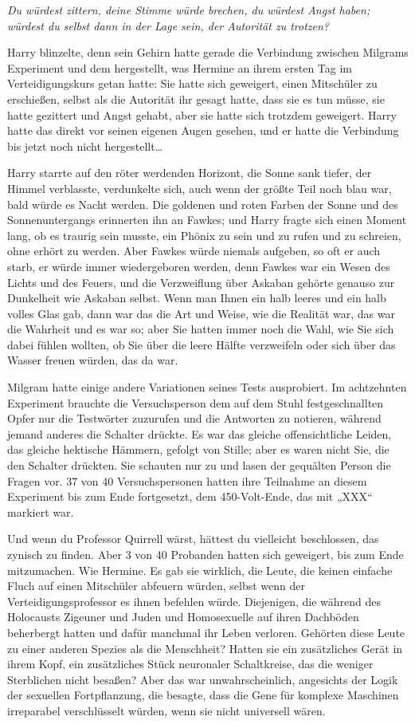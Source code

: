 {\emph{Du würdest zittern, deine Stimme würde brechen, du würdest Angst haben; würdest du selbst dann in der Lage sein, der Autorität zu trotzen?}

Harry blinzelte, denn sein Gehirn hatte gerade die Verbindung zwischen Milgrams Experiment und dem hergestellt, was Hermine an ihrem ersten Tag im Verteidigungskurs getan hatte: Sie hatte sich geweigert, einen Mitschüler zu erschießen, selbst als die Autorität ihr gesagt hatte, dass sie es tun müsse, sie hatte gezittert und Angst gehabt, aber sie hatte sich trotzdem geweigert. Harry hatte das direkt vor seinen eigenen Augen gesehen, und er hatte die Verbindung bis jetzt noch nicht hergestellt…

Harry starrte auf den röter werdenden Horizont, die Sonne sank tiefer, der Himmel verblasste, verdunkelte sich, auch wenn der größte Teil noch blau war, bald würde es Nacht werden. Die goldenen und roten Farben der Sonne und des Sonnenuntergangs erinnerten ihn an Fawkes; und Harry fragte sich einen Moment lang, ob es traurig sein musste, ein Phönix zu sein und zu rufen und zu schreien, ohne erhört zu werden. Aber Fawkes würde niemals aufgeben, so oft er auch starb, er würde immer wiedergeboren werden, denn Fawkes war ein Wesen des Lichts und des Feuers, und die Verzweiflung über Askaban gehörte genauso zur Dunkelheit wie Askaban selbst. Wenn man Ihnen ein halb leeres und ein halb volles Glas gab, dann war das die Art und Weise, wie die Realität war, das war die Wahrheit und es war so; aber Sie hatten immer noch die Wahl, wie Sie sich dabei fühlen wollten, ob Sie über die leere Hälfte verzweifeln oder sich über das Wasser freuen würden, das da war.

Milgram hatte einige andere Variationen seines Tests ausprobiert. Im achtzehnten Experiment brauchte die Versuchsperson dem auf dem Stuhl festgeschnallten Opfer nur die Testwörter zuzurufen und die Antworten zu notieren, während jemand anderes die Schalter drückte. Es war das gleiche offensichtliche Leiden, das gleiche hektische Hämmern, gefolgt von Stille; aber es waren nicht Sie, die den Schalter drückten. Sie schauten nur zu und lasen der gequälten Person die Fragen vor. 37 von 40 Versuchspersonen hatten ihre Teilnahme an diesem Experiment bis zum Ende fortgesetzt, dem 450-Volt-Ende, das mit „XXX“ markiert war.

Und wenn du Professor Quirrell wärst, hättest du vielleicht beschlossen, das zynisch zu finden. Aber 3 von 40 Probanden hatten sich geweigert, bis zum Ende mitzumachen. Wie Hermine. Es gab sie wirklich, die Leute, die keinen einfache Fluch auf einen Mitschüler abfeuern würden, selbst wenn der Verteidigungsprofessor es ihnen befehlen würde. Diejenigen, die während des Holocausts Zigeuner und Juden und Homosexuelle auf ihren Dachböden beherbergt hatten und dafür manchmal ihr Leben verloren. Gehörten diese Leute zu einer anderen Spezies als die Menschheit? Hatten sie ein zusätzliches Gerät in ihrem Kopf, ein zusätzliches Stück neuronaler Schaltkreise, das die weniger Sterblichen nicht besaßen? Aber das war unwahrscheinlich, angesichts der Logik der sexuellen Fortpflanzung, die besagte, dass die Gene für komplexe Maschinen irreparabel verschlüsselt würden, wenn sie nicht universell wären.

}
